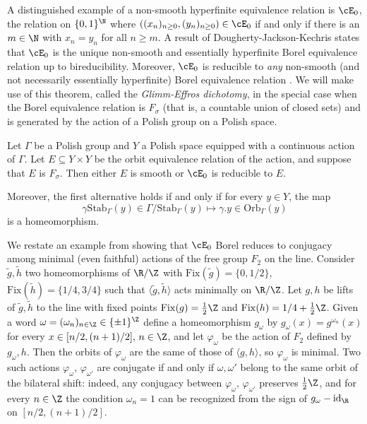 \documentclass[reqno]{amsart}
\begin{document}
A distinguished example of a non-smooth hyperfinite equivalence relation is $\cE_0$, the relation on $\{0,1\}^\N$ where $\left((x_n)_{n \geq 0}, (y_n)_{n \geq 0}\right) \in \cE_0$ if and only if there is an $m \in \N$ with $x_n = y_n$ for all $n \geq m$. A result of Dougherty-Jackson-Kechris \cite{DoughertyJacksonKechris1994} states that $\cE_0$ is the unique non-smooth and essentially hyperfinite Borel equivalence relation up to bireducibility. Moreover, $\cE_0$ is reducible to \emph{any} non-smooth (and not necessarily essentially hyperfinite) Borel equivalence relation \cite{HarringtonKechrisLouveau1990}. We will make use of this theorem, called the \emph{Glimm-Effros dichotomy}, in the special case when the Borel equivalence relation is $F_\sigma$ (that is, a countable union of closed sets) and is generated by the action of a Polish group on a Polish space.

\begin{teo} \label{teo:glimmEffrosIntro}
Let $\Gamma$ be a Polish group and $Y$ a Polish space equipped with a continuous action of $\Gamma$. Let $E \subseteq Y \times Y$ be the orbit equivalence relation of the action, and suppose that $E$ is $F_\sigma$. Then either $E$ is smooth or $\cE_0$ is reducible to  $E$.

Moreover, the first alternative holds if and only if for every $y \in Y$, the map
\[
	\gamma \mathrm{Stab}_\Gamma(y) \in \Gamma/\mathrm{Stab}_\Gamma(y) \mapsto \gamma.y \in \mathrm{Orb}_\Gamma(y)
\]
is a homeomorphism.
\end{teo}

\begin{ejm} \label{ejm:F2}
        We restate an example from \cite[Section 14.4]{BMRT} showing that $\cE_0$ Borel reduces to conjugacy among minimal (even faithful) actions of the free group $F_2$ on the line. Consider $\widetilde{g},\widetilde{h}$ two homeomorphisms of $\R/\Z$ with $\mathrm{Fix}(\widetilde{g}) = \{0, 1/2\}$, $\mathrm{Fix}(\widetilde{h}) = \{1/4, 3/4\}$ such that $\langle \widetilde{g}, \widetilde{h} \rangle$ acts minimally on $\R/\Z$. Let $g,h$ be lifts of $\widetilde{g}, \widetilde{h}$ to the line with fixed points $\mathrm{Fix}(g) = \frac{1}{2}\Z$ and $\mathrm{Fix}(h) = 1/4 + \frac{1}{2}\Z$. Given a word $\omega = (\omega_n)_{n \in \Z} \in \{\pm 1\}^\Z$ define a homeomorphism $g_\omega$ by $g_\omega(x) = g^{\omega_n}(x)$ for every $x \in [n/2, (n+1)/2], \, n \in \Z$, and let $\varphi_\omega$ be the action of $F_2$ defined by $g_\omega, h$. Then the orbits of $\varphi_\omega$ are the same of those of $\langle g, h \rangle$, so $\varphi_\omega$ is minimal. Two such actions $\varphi_\omega,\, \varphi_{\omega'}$ are conjugate if and only if $\omega, \omega'$ belong to the same orbit of the bilateral shift: indeed, any conjugacy between $\varphi_\omega, \, \varphi_{\omega'}$ preserves $\frac{1}{2}\Z$, and for every $n \in \Z$ the condition $\omega_n = 1$ can be recognized from the sign of $g_\omega - \mathrm{id}_\R$ on $[n/2, (n+1)/2]$.
\end{ejm}
\end{document}
